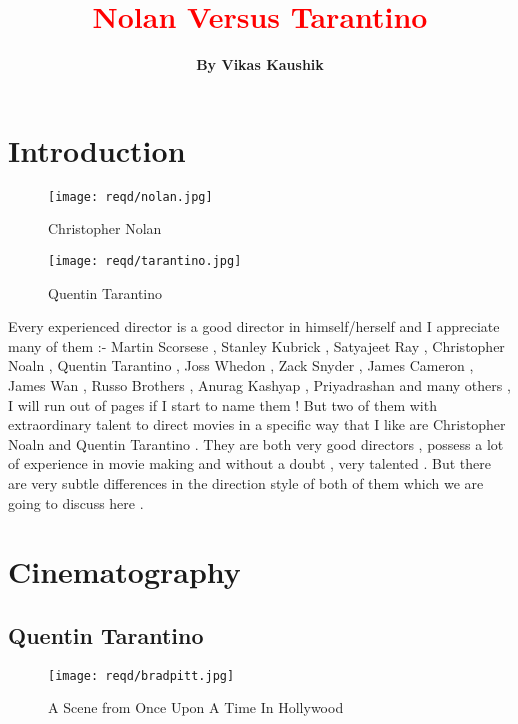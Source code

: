 \documentclass[14pt]{article}
\title{\Huge{\textbf{\textcolor{red}{Nolan Versus Tarantino}}}}
\author{\textbf{By Vikas Kaushik}}
\date{}
\begin{document}
\maketitle



\section{Introduction}
	\begin{figure}[h]
		\centering
		\begin{minipage}[b]{0.4\textwidth}
			\texttt{[image: reqd/nolan.jpg]}
			\caption{Christopher Nolan\label{nolan1}}
		\end{minipage}
		\hfill
		\begin{minipage}[b]{0.4\textwidth}
			\texttt{[image: reqd/tarantino.jpg]}
			\caption{Quentin Tarantino\label{tarantino1}}
		\end{minipage}
	\end{figure}
	Every experienced director is a good director in himself/herself and I appreciate many of them :- Martin Scorsese , Stanley Kubrick , Satyajeet Ray , Christopher Noaln , Quentin Tarantino , Joss Whedon , Zack Snyder , James Cameron , James Wan , Russo Brothers , Anurag Kashyap , Priyadrashan and many others , I will run out of pages if I start to name them ! But two of them with extraordinary talent to direct movies in a specific way that I like are Christopher Noaln and Quentin Tarantino . They are both very good directors , possess a lot of experience in movie making and without a doubt , very talented . But there are very subtle differences in the direction style of both of them which we are going to discuss here .



\section{Cinematography}
	\subsection{Quentin Tarantino}
		\begin{figure}[h]
			\centering
			\texttt{[image: reqd/bradpitt.jpg]}
			\caption{A Scene from Once Upon A Time In Hollywood \label{bradpitt1}}
		\end{figure}
\end{document}
